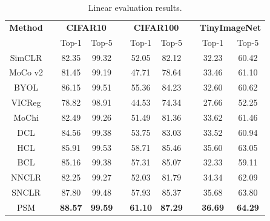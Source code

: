 \documentclass[review]{elsarticle}
\begin{document}
\begin{table}[]
\caption{Linear evaluation results.}
\label{table1}
\begin{center}
\begin{tabular}{clcclcclcc}
\hline
\textbf{Method}  &  & \multicolumn{2}{c}{\textbf{CIFAR10}} &  & \multicolumn{2}{c}{\textbf{CIFAR100}} &  & \multicolumn{2}{c}{\textbf{TinyImageNet}} \\ \cline{3-4} \cline{6-7} \cline{9-10} 
        &  & Top-1        & Top-5        &  & Top-1         & Top-5        &  & Top-1           & Top-5          \\ \hline
SimCLR \cite{b3}  &  & 82.35        & 99.32        &  & 52.05         & 82.12        &  & 32.23           & 60.42          \\
MoCo v2 \cite{b5} &  & 81.45        & 99.19        &  & 47.71         & 78.64        &  & 33.46           & 61.10          \\
BYOL  \cite{b6}  &  & 86.15        & 99.51        &  & 55.36         & 84.23        &  & 32.60           & 60.62          \\
VICReg \cite{b9} &  & 78.82        & 98.91        &  & 44.53         & 74.34        &  & 27.66           & 52.25          \\
MoChi \cite{b18}  &  & 82.49        & 99.26        &  & 51.49         & 81.36        &  & 33.62           & 61.46          \\
DCL  \cite{b19}   &  & 84.56        & 99.38        &  & 53.75         & 83.03        &  & 33.52           & 60.94          \\
HCL   \cite{b20} &  & 85.91        & 99.53        &  & 58.71         & 85.46        &  & 35.60           & 63.05          \\
BCL   \cite{b21}  &  & 85.16        & 99.38        &  & 57.31         & 85.07        &  & 32.33           & 59.11          \\
NNCLR  \cite{b12} &  & 82.25        & 99.27        &  & 52.03         & 81.79        &  & 34.34           & 62.09          \\
SNCLR \cite{b15}  &  & 87.80        & 99.48        &  & 57.93         & 85.37        &  & 35.68           & 63.80          \\
PSM     &  & \textbf{88.57}        & \textbf{99.59}        &  & \textbf{61.10}         & \textbf{87.29}        &  & \textbf{36.69}           & \textbf{64.29}          \\ \hline
\end{tabular}
\end{center}
\end{table}
\end{document}
